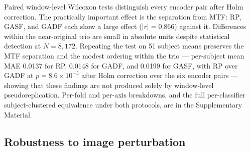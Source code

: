 \documentclass[5p]{elsarticle}
\begin{document}
\begin{table}[!htbp]
\centering
\caption{Range-normalised and spectral fidelity over 8,172 windows (mean\(\pm\)std across windows, averaged over the three axes). PSD-shape distance compares Welch spectra after each is normalised to unit mass; energy and band-mass errors are reported separately in the Supplementary Material.}\label{tab:fidelity_spectral}
\end{table}

Paired window-level Wilcoxon tests distinguish every encoder pair after Holm correction. The practically important effect is the separation from MTF: RP, GASF, and GADF each show a large effect (\(|r|=0.866\)) against it. Differences within the near-original trio are small in absolute units despite statistical detection at \(N=8{,}172\). Repeating the test on 51 subject means preserves the MTF separation and the modest ordering within the trio --- per-subject mean MAE 0.0137 for RP, 0.0148 for GADF, and 0.0199 for GASF, with RP over GADF at \(p=8.6\times10^{-5}\) after Holm correction over the six encoder pairs --- showing that these findings are not produced solely by window-level pseudoreplication. Per-fold and per-axis breakdowns, and the full per-classifier subject-clustered equivalence under both protocols, are in the Supplementary Material.

\subsection{Robustness to image perturbation}\label{sec:results_robustness}
\end{document}
